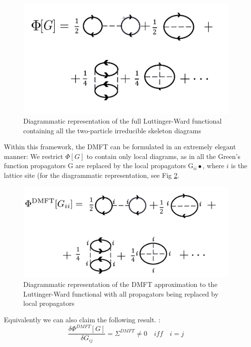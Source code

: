 \documentclass[10pt]{ruthesis}
\begin{document}
\begin{figure}[H]
\includegraphics[width=\columnwidth]{Lw_func_exact.jpg}
\caption{Diagrammatic representation of the full Luttinger-Ward functional containing all the two-particle irreducible skeleton diagrams \label{LW_exact}}
\end{figure} 
 
 
Within this framework, the DMFT can be formulated in an extremely elegant manner: We restrict $\Phi[G]$ to contain only local diagrams, as in all the Green's function propagators G are replaced by the local propagators G$_{ii}•$, where $i$ is the lattice site (for the diagrammatic representation, see Fig \ref{LW_DMFT}.

\begin{figure}[H]
\includegraphics[width=\columnwidth]{Lw_func_DMFT.jpg}
\caption{Diagrammatic representation of the DMFT approximation to the Luttinger-Ward functional with all propagators being replaced by local propagators \label{LW_DMFT}}
\end{figure}

 Equivalently we can also claim the following result.  :
\begin{equation}
 \dfrac{\delta  \Phi^{DMFT}[G]}{\delta  G_{ij}} =\Sigma^{DMFT} \neq 0 \quad iff \quad i=j
\end{equation}
\end{document}
